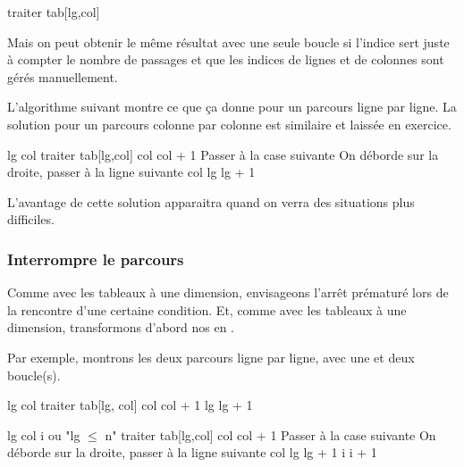 \begin{Pseudocode}
			\Stmt traiter tab[lg,col]
		\EndFor
	\EndFor
\end{Pseudocode}

Mais on peut obtenir le même résultat avec une seule boucle
si l'indice sert juste à compter le nombre de passages
et que les indices de lignes et de colonnes sont gérés manuellement.

L'algorithme suivant montre ce que ça donne
pour un parcours ligne par ligne.
La solution pour un parcours colonne par colonne est similaire
et laissée en exercice.

\begin{Pseudocode}
	\Let lg 
	\Let col 
		\Stmt traiter tab[lg,col]
		\Let col \Gets col + 1	\RComment Passer à la case suivante
		 \RComment On déborde sur la droite, passer à la ligne suivante
			\Let col 
			\Let lg \Gets lg + 1
		\EndIf
	\EndFor
\end{Pseudocode}

L'avantage de cette solution apparaitra 
quand on verra des situations plus difficiles.

\subsubsection*{Interrompre le parcours}

Comme avec les tableaux à une dimension, 
envisageons l'arrêt prématuré lors de la rencontre d'une certaine condition.
Et, comme avec les tableaux à une dimension, 
transformons d'abord nos  en .

Par exemple, montrons les deux parcours ligne par ligne, avec une et deux boucle(s).

\begin{Pseudocode}
	\Let lg 
		\Let col 
			\Stmt traiter tab[lg, col]
			\Let col \Gets col + 1
		\EndWhile
		\Let lg \Gets lg + 1
	\EndWhile
\end{Pseudocode}

\begin{Pseudocode}
	\Let lg 
	\Let col 
	\Let i 
	 \RComment ou "lg $\le$ n" 
		\Stmt traiter tab[lg,col]
		\Let col \Gets col + 1	\RComment Passer à la case suivante
		 \RComment On déborde sur la droite, passer à la ligne suivante
			\Let col 
			\Let lg \Gets lg + 1
		\EndIf
		\Let i \Gets i + 1		
	\EndWhile
\end{Pseudocode}

